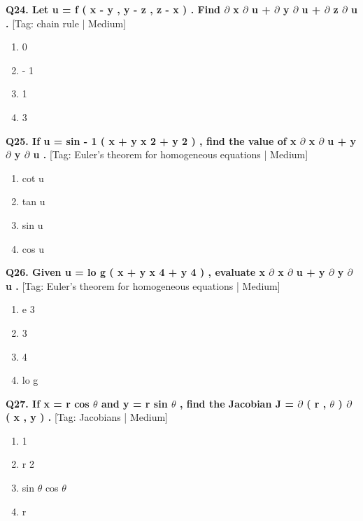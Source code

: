 \noindent\textbf{Q24. Let u = f ( x - y , y - z , z - x ) . Find $\partial$ x $\partial$ u + $\partial$ y $\partial$ u + $\partial$ z $\partial$ u .} \hfill [Tag: chain rule | Medium]
\begin{enumerate}[label=(\alph*),topsep=2pt,itemsep=1pt,partopsep=0pt,parsep=0pt]
    \item {{0}}
    \item {{- 1}}
    \item {{1}}
    \item {{3}}
\end{enumerate}
\vspace{2mm}

\noindent\textbf{Q25. If u = sin - 1 ( x + y x 2 + y 2 ) , find the value of x $\partial$ x $\partial$ u + y $\partial$ y $\partial$ u .} \hfill [Tag: Euler's theorem for homogeneous equations | Medium]
\begin{enumerate}[label=(\alph*),topsep=2pt,itemsep=1pt,partopsep=0pt,parsep=0pt]
    \item {{cot u}}
    \item {{tan u}}
    \item {{sin u}}
    \item {{cos u}}
\end{enumerate}
\vspace{2mm}

\noindent\textbf{Q26. Given u = lo g ( x + y x 4 + y 4 ) , evaluate x $\partial$ x $\partial$ u + y $\partial$ y $\partial$ u .} \hfill [Tag: Euler's theorem for homogeneous equations | Medium]
\begin{enumerate}[label=(\alph*),topsep=2pt,itemsep=1pt,partopsep=0pt,parsep=0pt]
    \item {{e 3}}
    \item {{3}}
    \item {{4}}
    \item {{lo g}}
\end{enumerate}
\vspace{2mm}

\noindent\textbf{Q27. If x = r cos $\theta$ and y = r sin $\theta$ , find the Jacobian J = $\partial$ ( r , $\theta$ ) $\partial$ ( x , y ) .} \hfill [Tag: Jacobians | Medium]
\begin{enumerate}[label=(\alph*),topsep=2pt,itemsep=1pt,partopsep=0pt,parsep=0pt]
    \item {{1}}
    \item {{r 2}}
    \item {{sin $\theta$ cos $\theta$}}
    \item {{r}}
\end{enumerate}
\vspace{2mm}

